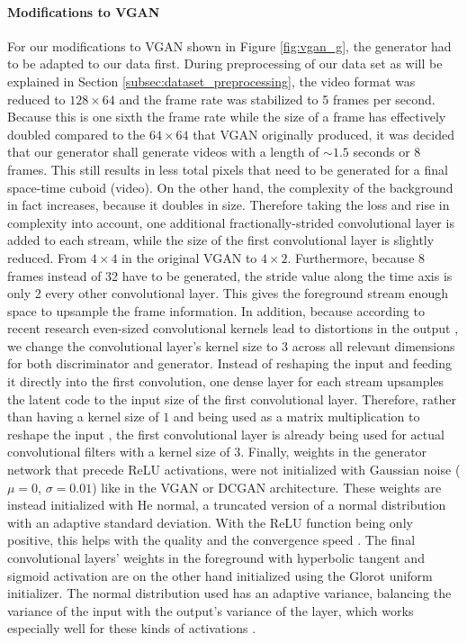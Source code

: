 \paragraph{Modifications to VGAN}
For our modifications to VGAN shown in Figure \ref{fig:vgan_g}, the generator had to be adapted to our data first. During preprocessing of our data set as will be explained in Section \ref{subsec:dataset_preprocessing}, the video format was reduced to $128 \times 64$ and the frame rate was stabilized to 5 frames per second. Because this is one sixth the frame rate while the size of a frame has effectively doubled compared to the $64 \times 64$ that VGAN originally produced, it was decided that our generator shall generate videos with a length of $\sim 1.5$ seconds or 8 frames. This still results in less total pixels that need to be generated for a final space-time cuboid (video). On the other hand, the complexity of the background in fact increases, because it doubles in size. Therefore taking the loss and rise in complexity into account, one additional fractionally-strided convolutional layer is added to each stream, while the size of the first convolutional layer is slightly reduced. From $4 \times 4$ in the original VGAN to $4 \times 2$. Furthermore, because 8 frames instead of 32 have to be generated, the stride value along the time axis is only 2 every other convolutional layer. This gives the foreground stream enough space to upsample the frame information. In addition, because according to recent research even-sized convolutional kernels lead to distortions in the output \cite{wu2019convolution}, we change the convolutional layer's kernel size to $3$ across all relevant dimensions for both discriminator and generator. Instead of reshaping the input and feeding it directly into the first convolution, one dense layer for each stream upsamples the latent code to the input size of the first convolutional layer. Therefore, rather than having a kernel size of $1$ and being used as a matrix multiplication to reshape the input \cite{radford2015unsupervised}, the first convolutional layer is already being used for actual convolutional filters with a kernel size of $3$. Finally, weights in the generator network that precede ReLU activations, were not initialized with Gaussian noise ($\mu=0$, $\sigma=0.01$) like in the VGAN or DCGAN architecture. These weights are instead initialized with He normal, a truncated version of a normal distribution with an adaptive standard deviation. With the ReLU function being only positive, this helps with the quality and the convergence speed \cite{he2015delving}. The final convolutional layers' weights in the foreground with hyperbolic tangent and sigmoid activation are on the other hand initialized using the Glorot uniform initializer. The normal distribution used has an adaptive variance, balancing the variance of the input with the output's variance of the layer, which works especially well for these kinds of activations \cite{glorot2010understanding}.

